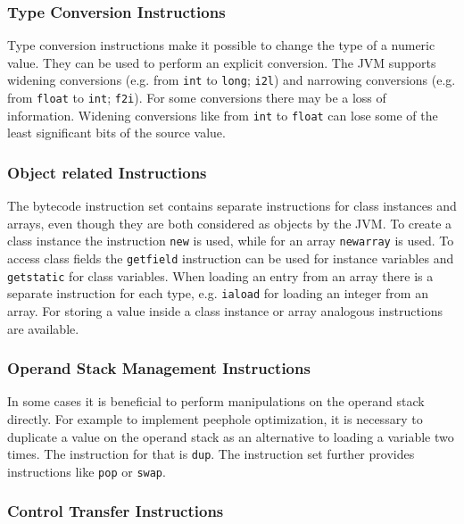 \subsubsection{Type Conversion Instructions}

Type conversion instructions make it possible to change the type of a numeric value. They can be used to perform an explicit conversion. The JVM supports widening conversions (e.g. from \texttt{int} to \texttt{long}; \texttt{i2l}) and narrowing conversions (e.g. from \texttt{float} to \texttt{int}; \texttt{f2i}). For some conversions there may be a loss of information. Widening conversions like from \texttt{int} to \texttt{float} can lose some of the least significant bits of the source value. 

\subsubsection{Object related Instructions}

The bytecode instruction set contains separate instructions for class instances and arrays, even though they are both considered as objects by the JVM. To create a class instance the instruction \texttt{new} is used, while for an array \texttt{newarray} is used. To access class fields the \texttt{getfield} instruction can be used for instance variables and \texttt{getstatic} for class variables. When loading an entry from an array there is a separate instruction for each type, e.g. \texttt{iaload} for loading an integer from an array. For storing a value inside a class instance or array analogous instructions are available. 

\subsubsection{Operand Stack Management Instructions}

In some cases it is beneficial to perform manipulations on the operand stack directly. For example to implement peephole optimization, it is necessary to duplicate a value on the operand stack as an alternative to loading a variable two times\parencite{mckeeman1965peephole}. The instruction for that is \texttt{dup}. The instruction set further provides instructions like \texttt{pop} or \texttt{swap}. 

\subsubsection{Control Transfer Instructions}

